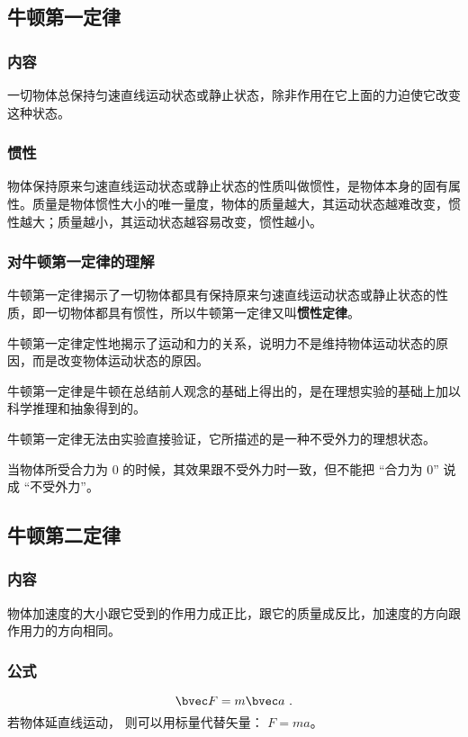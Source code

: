 

\subsection{牛顿第一定律}

\subsubsection{内容}
一切物体总保持匀速直线运动状态或静止状态，除非作用在它上面的力迫使它改变这种状态。

\subsubsection{惯性}
物体保持原来匀速直线运动状态或静止状态的性质叫做惯性，是物体本身的固有属性。质量是物体惯性大小的唯一量度，物体的质量越大，其运动状态越难改变，惯性越大；质量越小，其运动状态越容易改变，惯性越小。

\subsubsection{对牛顿第一定律的理解}
牛顿第一定律揭示了一切物体都具有保持原来匀速直线运动状态或静止状态的性质，即一切物体都具有惯性，所以牛顿第一定律又叫\textbf{惯性定律}。

牛顿第一定律定性地揭示了运动和力的关系，说明力不是维持物体运动状态的原因，而是改变物体运动状态的原因。

牛顿第一定律是牛顿在总结前人观念的基础上得出的，是在理想实验的基础上加以科学推理和抽象得到的。

牛顿第一定律无法由实验直接验证，它所描述的是一种不受外力的理想状态。

当物体所受合力为 $0$ 的时候，其效果跟不受外力时一致，但不能把 “合力为 $0$” 说成 “不受外力”。

\subsection{牛顿第二定律}
\subsubsection{内容}
物体加速度的大小跟它受到的作用力成正比，跟它的质量成反比，加速度的方向跟作用力的方向相同。

\subsubsection{公式}
\begin{equation}\label{eq_HSPM03_1}
\bvec F=m\bvec a~.
\end{equation}
若物体延直线运动， 则可以用标量代替矢量： $F=m a$。

